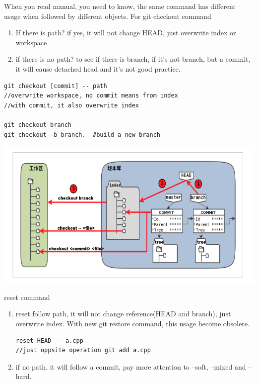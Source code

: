 \documentclass[paper=8.5in:11in, twoside, 12pt, pagesize=pdftex]{book}
\begin{document}
	 When you read manual, you need to know, the same command has different usage when followed by different objects. For git checkout command
\begin{enumerate}
	\item If there is path? if yes, it will not change HEAD, just overwrite index or workspace
	
	\item if there is no path?  to see if there is branch,  if it's not branch, but a commit,  it will cause detached head and it's not good practice. 
\end{enumerate}

\begin{lstlisting}
git checkout [commit] -- path  
//overwrite workspace, no commit means from index
//with commit, it also overwrite index

git checkout branch
git checkout -b branch.  #build a new branch
\end{lstlisting}

\begin{center}
	\includegraphics[scale=0.5]{pics/check.png}
\end{center}
		

	reset command 
\begin{enumerate}
	\item reset follow path, it will not change reference(HEAD and branch),  just overwrite index.  With new git restore command, this usage become obsolete. 
	
\begin{lstlisting}
reset HEAD -- a.cpp
//just oppsite operation git add a.cpp
\end{lstlisting}
	\item if no path.  it will follow a commit, pay more attention to --soft, --mixed and --hard. 
\end{enumerate}
\end{document}
